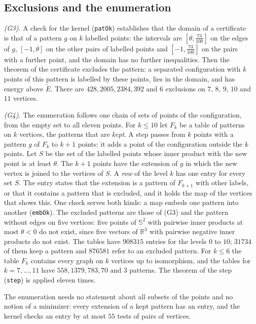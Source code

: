 \documentclass[reqno,a4paper,11pt]{amsart}
\numberwithin{equation}{section}
\def\R{{\mathbb R}}
\newcommand{\Sph}{\mathbb{S}}
\newcommand{\lean}[1]{\texttt{#1}}
\newcommand{\factNrgEnumEntries}{908315}
\newcommand{\factNrgEnumExcluded}{876581}
\newcommand{\factNrgEnumKept}{31734}
\newcommand{\factNrgEnumKeptList}{558, 1379, 783, 70 \text{ and } 3}
\newcommand{\factNrgExclList}{428, 2005, 2384, 392 \text{ and } 6}
\begin{document}
\subsection{Exclusions and the enumeration}

\emph{(G3).} A check for the kernel (\lean{patOk}) establishes that the domain of a certificate is that of a pattern $g$ on $k$ labelled points: the intervals are $[\theta, \tfrac{73}{100}]$ on the edges of $g$, $[-1, \theta]$ on the other pairs of labelled points and $[-1, \tfrac{73}{100}]$ on the pairs with a further point, and the domain has no further inequalities. Then the theorem of the certificate excludes the pattern: a separated configuration with $k$ points of this pattern is labelled by these points, lies in the domain, and has energy above $\tilde E$. There are $\factNrgExclList$ exclusions on $7$, $8$, $9$, $10$ and $11$ vertices.

\emph{(G4).} The enumeration follows one chain of sets of points of the configuration, from the empty set to all eleven points. For $k \leq 10$ let $F_k$ be a table of patterns on $k$ vertices, the patterns that are \emph{kept}. A step passes from $k$ points with a pattern $g$ of $F_k$ to $k+1$ points: it adds a point of the configuration outside the $k$ points. Let $S$ be the set of the labelled points whose inner product with the new point is at least $\theta$. The $k+1$ points have the extension of $g$ in which the new vertex is joined to the vertices of $S$. A \emph{row} of the level $k$ has one entry for every set $S$. The entry states that the extension is a pattern of $F_{k+1}$ with other labels, or that it contains a pattern that is excluded, and it holds the map of the vertices that shows this. One check serves both kinds: a map embeds one pattern into another (\lean{embOk}). The excluded patterns are those of (G3) and the pattern without edges on five vertices: five points of $\Sph^2$ with pairwise inner products at most $\theta < 0$ do not exist, since five vectors of $\R^3$ with pairwise negative inner products do not exist. The tables have $\factNrgEnumEntries$ entries for the levels $0$ to $10$; $\factNrgEnumKept$ of them keep a pattern and $\factNrgEnumExcluded$ refer to an excluded pattern. For $k \leq 6$ the table $F_k$ contains every graph on $k$ vertices up to isomorphism, and the tables for $k = 7, \dots, 11$ have $\factNrgEnumKeptList$ patterns. The theorem of the step (\lean{step}) is applied eleven times.

The enumeration needs no statement about all subsets of the points and no notion of a minimizer: every extension of a kept pattern has an entry, and the kernel checks an entry by at most $55$ tests of pairs of vertices.
\end{document}
